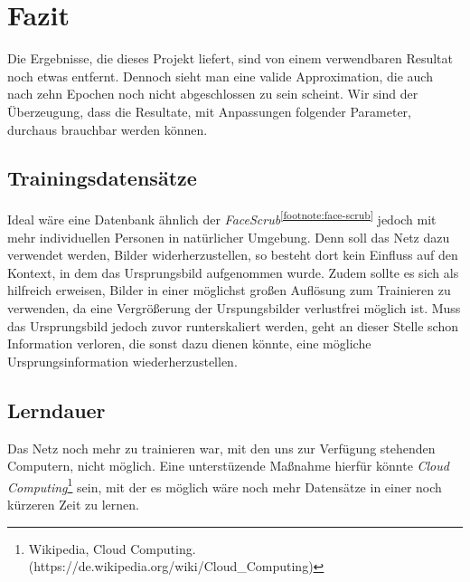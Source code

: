 \section{Fazit}

Die Ergebnisse, die dieses Projekt liefert, sind von einem verwendbaren Resultat noch etwas entfernt. Dennoch sieht man eine
valide Approximation, die auch nach zehn Epochen noch nicht abgeschlossen zu sein scheint. Wir sind der Überzeugung, dass die Resultate,
mit Anpassungen folgender Parameter, durchaus brauchbar werden können.

\subsection{Trainingsdatensätze}
Ideal wäre eine Datenbank ähnlich der \textit{FaceScrub}\textsuperscript{\ref{footnote:face-scrub}} jedoch mit mehr
individuellen Personen in natürlicher Umgebung. Denn soll das Netz dazu verwendet werden, Bilder widerherzustellen, so
besteht dort kein Einfluss auf den Kontext, in dem das Ursprungsbild aufgenommen wurde.
Zudem sollte es sich als hilfreich erweisen, Bilder in einer möglichst großen Auflösung zum Trainieren zu verwenden, da
eine Vergrößerung der Urspungsbilder verlustfrei möglich ist. Muss das Ursprungsbild jedoch zuvor runterskaliert werden, geht
an dieser Stelle schon Information verloren, die sonst dazu dienen könnte, eine mögliche Ursprungsinformation wiederherzustellen.

\subsection{Lerndauer}
Das Netz noch mehr zu trainieren war, mit den uns zur Verfügung stehenden Computern, nicht möglich. Eine unterstüzende Maßnahme
hierfür könnte \textit{Cloud Computing}\footnote{Wikipedia, Cloud Computing.\newline(https://de.wikipedia.org/wiki/Cloud\_Computing)}
sein, mit der es möglich wäre noch mehr Datensätze in einer noch kürzeren Zeit zu lernen.
